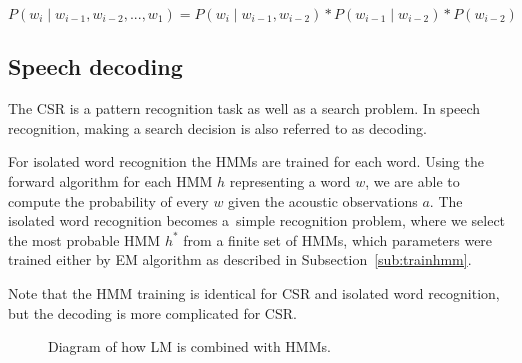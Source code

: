{\begin{equation} \label{eq:ngram}
    P(w_i \mid w_{i-1}, w_{i-2}, ..., w_1) = P(w_i \mid w_{i-1}, w_{i-2}) * P(w_{i-1} \mid w_{i-2}) * P(w_{i-2})
\end{equation}

\subsection{Speech decoding}
\label{sub:decode}
The \ac{CSR} is a pattern recognition task as well as a search problem.
In speech recognition, making a search decision is also referred to as decoding.\cite{huang2001spoken}


For isolated word recognition the \acp{HMM} are trained for each word.
Using the forward algorithm for each \ac{HMM} $h$ representing a word $w$, 
we are able to compute the probability  of every $w$ given the acoustic observations $a$.
The isolated word recognition becomes a~simple recognition problem,
where we select the most probable \ac{HMM} $h^*$ from a finite set of \acp{HMM},
which parameters were trained either by \ac{EM} algorithm as described in Subsection~\ref{sub:trainhmm}.

Note that the \ac{HMM} training is identical for \ac{CSR} and isolated word recognition,
but the decoding is more complicated for \ac{CSR}.

\begin{figure}[!htp]
    \begin{center}
        
        \caption{Diagram of how \ac{LM} is combined with \acp{HMM}.}
        \label{fig:hmm_lm} 
    \end{center}
\end{figure}

}
